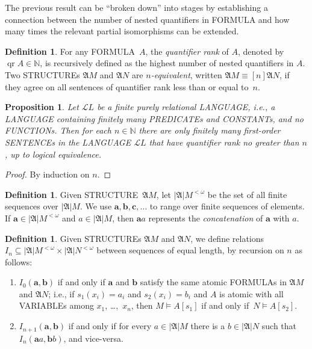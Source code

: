 \documentclass[10pt,a4paper]{article}
\newcommand*{\olup}[1]{\MakeUppercase{#1}}
\theoremstyle{plain}
\newtheorem{prop}[thm]{Proposition}
\theoremstyle{definition}
\newtheorem{defn}[thm]{Definition}
\theoremstyle{remark}
\newcommand*{\ollabel}[1]{\label{#1}}
\providecommand{\Struct}{\ensuremath{\mathfrak{A}}}
\providecommand{\Domain}{\ensuremath{|\mathfrak{A}|}}
\providecommand{\Sat}[2]{\ensuremath{#1 \models #2}}
\providecommand{\Lang}{\ensuremath{\mathcal{L}}}
\providecommand{\Nat}{\ensuremath{\mathbb{N}}}
\providecommand{\QuantRank}{\operatorname{qr}}
\providecommand{\elemequiv}{\mathrel{\equiv}}
\begin{document}
The previous result can be ``broken down'' into stages by establishing a
connection between the number of nested quantifiers in \olup{formula} and
how many times the relevant partial isomorphisms can be extended.

\begin{defn}
  For any \olup{formula}~$A$, the \emph{quantifier rank} of $A$, denoted
  by $\QuantRank{A} \in \Nat$, is recursively defined as
  the highest number of nested quantifiers in $A$.  Two
  \olup{structure}s $\Struct{M}$ and $\Struct{N}$ are \emph{$n$-equivalent},
  written $\Struct{M} \elemequiv[n] \Struct{N}$, if they agree on all
  sentences of quantifier rank less than or equal to~$n$.
\end{defn}

\begin{prop}\ollabel{prop:qr-finite}
  Let $\Lang{L}$ be a finite purely relational \olup{language}, i.e., a
  \olup{language} containing finitely many \olup{predicate}s and \olup{constant}s,
  and no \olup{function}s. Then for each $n \in \Nat$ there are
  only finitely many first-order \olup{sentence}s in the \olup{language}
  $\Lang{L}$ that have quantifier rank no greater than $n$, up to
  logical equivalence.
\end{prop}

\begin{proof}
  By induction on $n$.
\end{proof}

\begin{defn}
  Given \olup{structure}~$\Struct{M}$, let $\Domain M^{<\omega}$ be the set of
  all finite sequences over $\Domain{M}$. We use $\mathbf{a},
  \mathbf{b}, \mathbf{c}, \ldots$ to range over finite sequences of
  elements. If $\mathbf{a} \in \Domain{M}^{<\omega}$ and $a \in \Domain{M}$, then
  $\mathbf{a}a$ represents the \emph{concatenation} of $\mathbf{a}$ with $a$.
\end{defn}

\begin{defn}
  Given \olup{structure}s $\Struct{M}$ and $\Struct{N}$, we define
  relations $I_n \subseteq \Domain M^{<\omega} \times \Domain N^{<\omega}$ between
  sequences of equal length, by recursion on $n$ as follows:
   \begin{enumerate}
   \item $I_0(\mathbf{a},\mathbf{b})$ if and only if $\mathbf{a}$ and
     $\mathbf{b}$ satisfy the same atomic \olup{formula}s in  $\Struct{M}$
     and  $\Struct{N}$; i.e., if $s_1(x_i) = a_i$ and $s_2(x_i) =
     b_i$ and $A$ is atomic with all \olup{variable}s among
     $x_1$, \dots,~$x_n$, then $\Sat{M}{A}[s_1]$ if and
     only if~$\Sat{N}{A}[s_2]$.
   \item $I_{n+1} (\mathbf{a},\mathbf{b})$ if and only if for every
     $a\in \Domain M$ there is a $b\in \Domain N$ such that $I_n
     (\mathbf{a}a,\mathbf{b}b)$, and vice-versa.
   \end{enumerate}
\end{defn}
\end{document}
